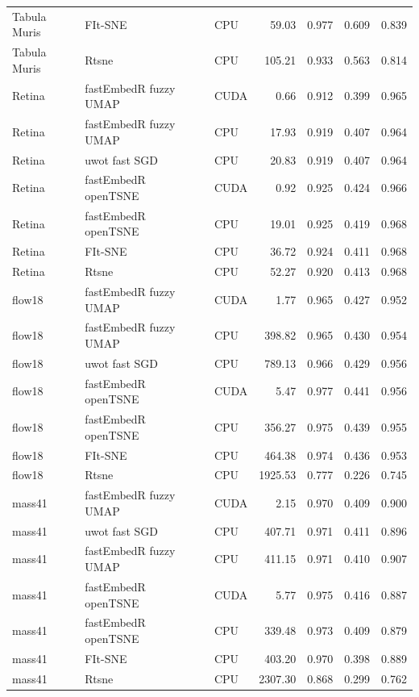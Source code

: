 {\begin{longtable}{p{}p{}lrrrr}
Tabula Muris & FIt-SNE & CPU & 59.03 & 0.977 & 0.609 & 0.839\\
Tabula Muris & Rtsne & CPU & 105.21 & 0.933 & 0.563 & 0.814\\
Retina & fastEmbedR fuzzy UMAP & CUDA & 0.66 & 0.912 & 0.399 & 0.965\\
Retina & fastEmbedR fuzzy UMAP & CPU & 17.93 & 0.919 & 0.407 & 0.964\\
Retina & uwot fast SGD & CPU & 20.83 & 0.919 & 0.407 & 0.964\\
Retina & fastEmbedR openTSNE & CUDA & 0.92 & 0.925 & 0.424 & 0.966\\
Retina & fastEmbedR openTSNE & CPU & 19.01 & 0.925 & 0.419 & 0.968\\
Retina & FIt-SNE & CPU & 36.72 & 0.924 & 0.411 & 0.968\\
Retina & Rtsne & CPU & 52.27 & 0.920 & 0.413 & 0.968\\
flow18 & fastEmbedR fuzzy UMAP & CUDA & 1.77 & 0.965 & 0.427 & 0.952\\
flow18 & fastEmbedR fuzzy UMAP & CPU & 398.82 & 0.965 & 0.430 & 0.954\\
flow18 & uwot fast SGD & CPU & 789.13 & 0.966 & 0.429 & 0.956\\
flow18 & fastEmbedR openTSNE & CUDA & 5.47 & 0.977 & 0.441 & 0.956\\
flow18 & fastEmbedR openTSNE & CPU & 356.27 & 0.975 & 0.439 & 0.955\\
flow18 & FIt-SNE & CPU & 464.38 & 0.974 & 0.436 & 0.953\\
flow18 & Rtsne & CPU & 1925.53 & 0.777 & 0.226 & 0.745\\
mass41 & fastEmbedR fuzzy UMAP & CUDA & 2.15 & 0.970 & 0.409 & 0.900\\
mass41 & uwot fast SGD & CPU & 407.71 & 0.971 & 0.411 & 0.896\\
mass41 & fastEmbedR fuzzy UMAP & CPU & 411.15 & 0.971 & 0.410 & 0.907\\
mass41 & fastEmbedR openTSNE & CUDA & 5.77 & 0.975 & 0.416 & 0.887\\
mass41 & fastEmbedR openTSNE & CPU & 339.48 & 0.973 & 0.409 & 0.879\\
mass41 & FIt-SNE & CPU & 403.20 & 0.970 & 0.398 & 0.889\\
mass41 & Rtsne & CPU & 2307.30 & 0.868 & 0.299 & 0.762\\
\bottomrule
\end{longtable}
}
